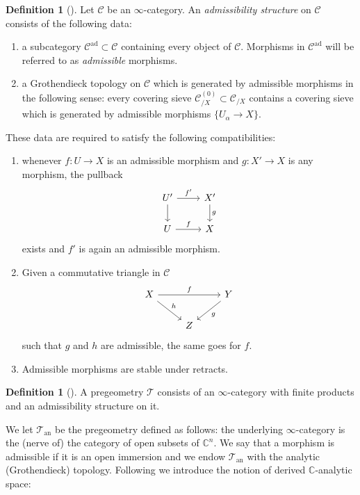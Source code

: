 \documentclass[12pt,a4paper,reqno]{amsart}
\theoremstyle{plain}
\theoremstyle{definition}
\newtheorem{defin}[thm]{Definition}
\theoremstyle{remark}
\numberwithin{equation}{section}
\begin{document}
\begin{defin}[{\cite[Def.\ 1.2.1]{DAG-V}}] \label{def:admissibility_structure}
	Let ${\mathcal C}$ be an $\infty$-category.
	An \emph{admissibility structure} on ${\mathcal C}$ consists of the following data:
	\begin{enumerate}
		\item a subcategory ${\mathcal C}^{\mathrm{ad}} \subset {\mathcal C}$ containing every object of ${\mathcal C}$. Morphisms in ${\mathcal C}^{\mathrm{ad}}$ will be referred to as \emph{admissible} morphisms.
		\item a Grothendieck topology on ${\mathcal C}$ which is generated by admissible morphisms in the following sense: every covering sieve ${\mathcal C}^{(0)}_{/X} \subset {\mathcal C}_{/X}$ contains a covering sieve which is generated by admissible morphisms $\{U_\alpha \to X\}$.
	\end{enumerate}
	These data are required to satisfy the following compatibilities:
	\begin{enumerate}
		\item whenever $f \colon U \to X$ is an admissible morphism and $g \colon X' \to X$ is any morphism, the pullback
		\[ \begin{tikzcd}
			U' \arrow{r}{f'} \arrow{d} & X' \arrow{d}{g} \\
			U \arrow{r}{f} & X
		\end{tikzcd} \]
		exists and $f'$ is again an admissible morphism.
		\item Given a commutative triangle in ${\mathcal C}$
		\[ \begin{tikzcd}
			X \arrow{dr}{h} \arrow{rr}{f} & & Y \arrow{dl}{g} \\
			& Z
		\end{tikzcd} \]
		such that $g$ and $h$ are admissible, the same goes for $f$.
		\item Admissible morphisms are stable under retracts.
	\end{enumerate}
\end{defin}

\begin{defin}[{\cite[Def.\ 3.1.1]{DAG-V}}]
	A pregeometry ${\mathcal T}$ consists of an $\infty$-category with finite products and an admissibility structure on it.
\end{defin}

We let ${{\mathcal T}_{\mathrm{an}}}$ be the pregeometry defined as follows: the underlying $\infty$-category is the (nerve of) the category of open subsets of $\mathbb C^n$. We say that a morphism is admissible if it is an open immersion and we endow ${{\mathcal T}_{\mathrm{an}}}$ with the analytic (Grothendieck) topology.
Following \cite{DAG-IX} we introduce the notion of derived {$\mathbb C$-analytic\xspace} space:
\end{document}
